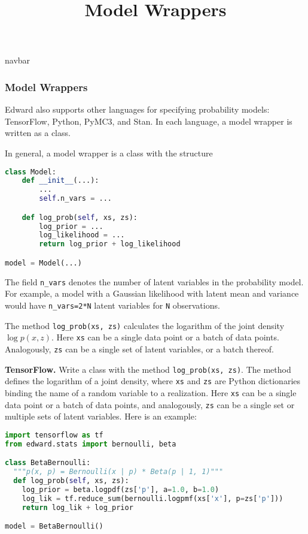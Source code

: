 \title{Model Wrappers}

{{navbar}}

\subsubsection{Model Wrappers}

Edward also supports other languages for specifying probability models:
TensorFlow, Python, PyMC3, and Stan.
In each language, a model wrapper is written as a class.

In general, a model wrapper is a class with the structure

\begin{lstlisting}[language=Python]
class Model:
    def __init__(...):
        ...
        self.n_vars = ...

    def log_prob(self, xs, zs):
        log_prior = ...
        log_likelihood = ...
        return log_prior + log_likelihood

model = Model(...)
\end{lstlisting}

The field \texttt{n_vars} denotes the number of latent variables in the
probability model. For example, a model with a Gaussian likelihood with latent
mean and variance would have \texttt{n_vars=2*N} latent variables for
\texttt{N} observations.

The method \texttt{log_prob(xs, zs)} calculates the logarithm of
the joint density $\log p(x,z)$. Here \texttt{xs} can be a single data
point or a batch of data points. Analogously, \texttt{zs} can be a
single set of latent variables, or a batch thereof.

\textbf{TensorFlow.}
Write a class with the method \texttt{log_prob(xs, zs)}. The method defines
the logarithm of a joint density, where \texttt{xs} and \texttt{zs} are Python
dictionaries binding the name of a random variable to
a realization.
Here \texttt{xs} can be a single data
point or a batch of data points, and analogously, \texttt{zs} can be a
single set or multiple sets of latent variables.
Here is an example:

\begin{lstlisting}[language=Python]
import tensorflow as tf
from edward.stats import bernoulli, beta

class BetaBernoulli:
  """p(x, p) = Bernoulli(x | p) * Beta(p | 1, 1)"""
  def log_prob(self, xs, zs):
    log_prior = beta.logpdf(zs['p'], a=1.0, b=1.0)
    log_lik = tf.reduce_sum(bernoulli.logpmf(xs['x'], p=zs['p']))
    return log_lik + log_prior

model = BetaBernoulli()
\end{lstlisting}

